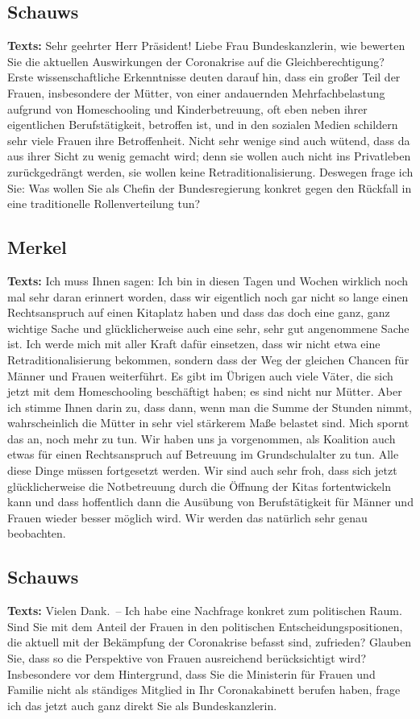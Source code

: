 \documentclass{article}
\begin{document}
\subsection{Schauws}
\noindent\textbf{Texts:} Sehr geehrter Herr Präsident! Liebe Frau Bundeskanzlerin, wie bewerten Sie die aktuellen Auswirkungen der Coronakrise auf die Gleichberechtigung? Erste wissenschaftliche Erkenntnisse deuten darauf hin, dass ein großer Teil der Frauen, insbesondere der Mütter, von einer andauernden Mehrfachbelastung aufgrund von Homeschooling und Kinderbetreuung, oft eben neben ihrer eigentlichen Berufstätigkeit, betroffen ist, und in den sozialen Medien schildern sehr viele Frauen ihre Betroffenheit. Nicht sehr wenige sind auch wütend, dass da aus ihrer Sicht zu wenig gemacht wird; denn sie wollen auch nicht ins Privatleben zurückgedrängt werden, sie wollen keine Retraditionalisierung. Deswegen frage ich Sie: Was wollen Sie als Chefin der Bundesregierung konkret gegen den Rückfall in eine traditionelle Rollenverteilung tun?

\subsection{Merkel}
\noindent\textbf{Texts:} Ich muss Ihnen sagen: Ich bin in diesen Tagen und Wochen wirklich noch mal sehr daran erinnert worden, dass wir eigentlich noch gar nicht so lange einen Rechtsanspruch auf einen Kitaplatz haben und dass das doch eine ganz, ganz wichtige Sache und glücklicherweise auch eine sehr, sehr gut angenommene Sache ist. Ich werde mich mit aller Kraft dafür einsetzen, dass wir nicht etwa eine Retraditionalisierung bekommen, sondern dass der Weg der gleichen Chancen für Männer und Frauen weiterführt. Es gibt im Übrigen auch viele Väter, die sich jetzt mit dem Homeschooling beschäftigt haben; es sind nicht nur Mütter. Aber ich stimme Ihnen darin zu, dass dann, wenn man die Summe der Stunden nimmt, wahrscheinlich die Mütter in sehr viel stärkerem Maße belastet sind. Mich spornt das an, noch mehr zu tun. Wir haben uns ja vorgenommen, als Koalition auch etwas für einen Rechtsanspruch auf Betreuung im Grundschulalter zu tun. Alle diese Dinge müssen fortgesetzt werden. Wir sind auch sehr froh, dass sich jetzt glücklicherweise die Notbetreuung durch die Öffnung der Kitas fortentwickeln kann und dass hoffentlich dann die Ausübung von Berufstätigkeit für Männer und Frauen wieder besser möglich wird. Wir werden das natürlich sehr genau beobachten.

\subsection{Schauws}
\noindent\textbf{Texts:} Vielen Dank. – Ich habe eine Nachfrage konkret zum politischen Raum. Sind Sie mit dem Anteil der Frauen in den politischen Entscheidungspositionen, die aktuell mit der Bekämpfung der Coronakrise befasst sind, zufrieden? Glauben Sie, dass so die Perspektive von Frauen ausreichend berücksichtigt wird? Insbesondere vor dem Hintergrund, dass Sie die Ministerin für Frauen und Familie nicht als ständiges Mitglied in Ihr Coronakabinett berufen haben, frage ich das jetzt auch ganz direkt Sie als Bundeskanzlerin.
\end{document}
